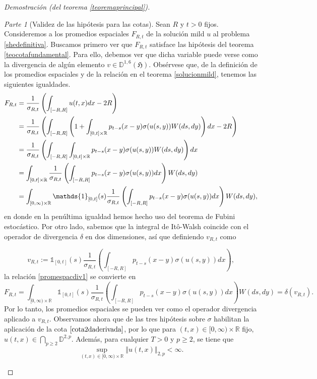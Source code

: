\documentclass[letterpaper,twoside,12pt]{book}
\newcommand{\R}{\mathbb{R}}
\newcommand{\D}{\mathbb{D}}
\newcommand{\1}{\mathds{1}}
\newcommand{\norm}[1]{\left\Vert #1 \right\Vert}
\theoremstyle{definition}
\theoremstyle{definition}
\theoremstyle{remark}
\newtheorem{proofpart}{Parte}
\theoremstyle{definition}
\theoremstyle{definition}
\theoremstyle{definition}
\theoremstyle{definition}
\theoremstyle{definition}
\begin{document}
\begin{proof}[Demostración (del teorema \ref{teoremaprincipal})]

\begin{proofpart}[Validez de las hipótesis para las cotas]
Sean $R$ y $t>0$ fijos. Consideremos a los promedios espaciales $F_{R,t}$ de la solución mild $u$ al problema \eqref{shedefinitiva}. Buscamos primero ver que $F_{R,t}$ satisface las hipótesis del teorema \ref{teocotafundamental}. Para ello, debemos ver que dicha variable puede verse como la divergencia de algún elemento $v\in \D^{1,6}(\mathfrak{H})$. Obsérvese que, de la definición de los promedios espaciales y de la relación en el teorema \ref{solucionmild}, tenemos las siguientes igualdades.
\begin{align}
   F_{R,t}&=\frac{1}{\sigma_{R,t}}\left(\int_{[-R,R]}u(t,x)dx-2R\right)\notag\\
   &=\frac{1}{\sigma_{R,t}}\left(\int_{[-R,R]}\left(1+\int_{[0,t]\times \R}p_{t-s}(x-y)\sigma(u(s,y))W(ds,dy)\right)dx-2R\right)\notag\\
   &=\frac{1}{\sigma_{R,t}}\left(\int_{[-R,R]}\int_{[0,t]\times \R}p_{t-s}(x-y)\sigma(u(s,y))W(ds,dy)\right)dx\notag\\
   &=\int_{[0,t]\times \R}\frac{1}{\sigma_{R,t}}\left(\int_{[-R,R]}p_{t-s}(x-y)\sigma(u(s,y))dx\right)W(ds,dy)\notag\\
   &=\int_{[0,\infty)\times \R}\1_{[0,t]}(s)\frac{1}{\sigma_{R,t}}\left(\int_{[-R,R]}p_{t-s}(x-y)\sigma(u(s,y))dx\right)W(ds,dy)\label{promespacdiv1},
\end{align}
en donde en la penúltima igualdad hemos hecho uso del teorema de Fubini estocástico. Por otro lado, sabemos que la integral de Itô-Walsh coincide con el operador de divergencia $\delta$ en dos dimensiones, así que definiendo $v_{R,t}$ como 

\begin{equation}\label{vectordireccion}
      v_{R,t}:=\1_{[0,t]}(s)\frac{1}{\sigma_{R,t}}\left(\int_{[-R,R]}p_{t-s}(x-y)\sigma(u(s,y))dx\right),
\end{equation}
 la relación \eqref{promespacdiv1} se convierte en
\begin{equation}\label{promespacialdiv2}
F_{R,t}=\int_{[0,\infty)\times \R}\1_{[0,t]}(s)\frac{1}{\sigma_{R,t}}\left(\int_{[-R,R]}p_{t-s}(x-y)\sigma(u(s,y))dx\right)W(ds,dy)=\delta(v_{R,t}).
\end{equation}
Por lo tanto, los promedios espaciales se pueden ver como el operador divergencia aplicado a $v_{R,t}$. Observamos ahora que de las tres hipótesis sobre $\sigma$ habilitan la aplicación de la cota $\eqref{cota2daderivada}$, por lo que para $(t,x)\in [0,\infty)\times\R$ fijo, $u(t,x)\in \bigcap_{p\geq2} \D^{2,p}$. Además, para cualquier $T>0$ y $p\geq2$, se tiene que 
\begin{equation}\label{cotaunif}
      \sup_{(t,x)\in [0,\infty)\times\R}\norm{u(t,x)}_{2,p}<\infty.
\end{equation}


\end{proofpart}
\end{proof}
\end{document}
